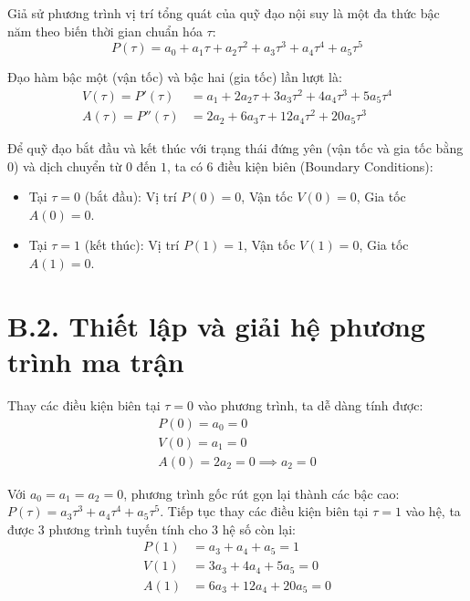 Giả sử phương trình vị trí tổng quát của quỹ đạo nội suy là một đa thức bậc năm theo biến thời gian chuẩn hóa $\tau$:
\begin{equation}
P(\tau) = a_0 + a_1\tau + a_2\tau^2 + a_3\tau^3 + a_4\tau^4 + a_5\tau^5
\end{equation}

Đạo hàm bậc một (vận tốc) và bậc hai (gia tốc) lần lượt là:
\begin{align}
V(\tau) = P'(\tau) &= a_1 + 2a_2\tau + 3a_3\tau^2 + 4a_4\tau^3 + 5a_5\tau^4 \\
A(\tau) = P''(\tau) &= 2a_2 + 6a_3\tau + 12a_4\tau^2 + 20a_5\tau^3
\end{align}

Để quỹ đạo bắt đầu và kết thúc với trạng thái đứng yên (vận tốc và gia tốc bằng $0$) và dịch chuyển từ $0$ đến $1$, ta có 6 điều kiện biên (Boundary Conditions):
\begin{itemize}
    \item Tại $\tau = 0$ (bắt đầu): Vị trí $P(0) = 0$, Vận tốc $V(0) = 0$, Gia tốc $A(0) = 0$.
    \item Tại $\tau = 1$ (kết thúc): Vị trí $P(1) = 1$, Vận tốc $V(1) = 0$, Gia tốc $A(1) = 0$.
\end{itemize}

\section*{B.2. Thiết lập và giải hệ phương trình ma trận}

Thay các điều kiện biên tại $\tau = 0$ vào phương trình, ta dễ dàng tính được:
\begin{align}
P(0) = a_0 = 0 \\
V(0) = a_1 = 0 \\
A(0) = 2a_2 = 0 \implies a_2 = 0
\end{align}

Với $a_0 = a_1 = a_2 = 0$, phương trình gốc rút gọn lại thành các bậc cao: $P(\tau) = a_3\tau^3 + a_4\tau^4 + a_5\tau^5$.
Tiếp tục thay các điều kiện biên tại $\tau = 1$ vào hệ, ta được 3 phương trình tuyến tính cho 3 hệ số còn lại:
\begin{align}
P(1) &= a_3 + a_4 + a_5 = 1 \label{eq:p1}\\
V(1) &= 3a_3 + 4a_4 + 5a_5 = 0 \label{eq:v1}\\
A(1) &= 6a_3 + 12a_4 + 20a_5 = 0 \label{eq:a1}
\end{align}

